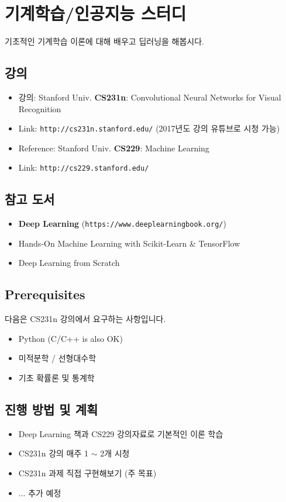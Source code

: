 \documentclass[12pt]{article}
\begin{document}
\section{기계학습/인공지능 스터디}
기초적인 기계학습 이론에 대해 배우고 딥러닝을 해봅시다.
\subsection{강의}
\begin{itemize}
	\item 강의: Stanford Univ. \textbf{CS231n}: Convolutional Neural Networks for Visual Recognition
	\item Link: \texttt{http://cs231n.stanford.edu/} (2017년도 강의 유튜브로 시청 가능)
	\item Reference: Stanford Univ. \textbf{CS229}: Machine Learning
	\item Link: \texttt{http://cs229.stanford.edu/}
\end{itemize}
\subsection{참고 도서}
\begin{itemize}
	\item \textbf{Deep Learning} (\texttt{https://www.deeplearningbook.org/})
	\item Hands-On Machine Learning with Scikit-Learn \& TensorFlow
	\item Deep Learning from Scratch
\end{itemize}

\subsection{Prerequisites}
다음은 CS231n 강의에서 요구하는 사항입니다.
\begin{itemize}
	\item Python (C/C++ is also OK)
	\item 미적분학 / 선형대수학
	\item 기초 확률론 및 통계학
\end{itemize}

\subsection{진행 방법 및 계획}
\begin{itemize}
	\item Deep Learning 책과 CS229 강의자료로 기본적인 이론 학습
	\item CS231n 강의 매주 1 $\sim$ 2개 시청
	\item CS231n 과제 직접 구현해보기 (주 목표)
	\item ... 추가 예정
\end{itemize}
\end{document}
